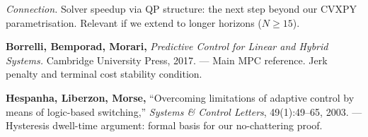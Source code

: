 \documentclass[12pt,a4paper]{article}
\begin{document}
\begin{enumerate}[label={[\arabic*]}, leftmargin=1.5cm, itemsep=10pt]
  \textit{Connection.}
  Solver speedup via QP structure: the next step beyond our CVXPY
  parametrisation. Relevant if we extend to longer horizons ($N \geq 15$).

  \medskip

  \item \textbf{Borrelli, Bemporad, Morari,} \textit{Predictive Control for
    Linear and Hybrid Systems.} Cambridge University Press, 2017. ---
    Main MPC reference. Jerk penalty and terminal cost stability condition.

  \item \textbf{Hespanha, Liberzon, Morse,} ``Overcoming limitations of
    adaptive control by means of logic-based switching,''
    \textit{Systems \& Control Letters}, 49(1):49--65, 2003. ---
    Hysteresis dwell-time argument: formal basis for our no-chattering proof.

\end{enumerate}
\end{document}
